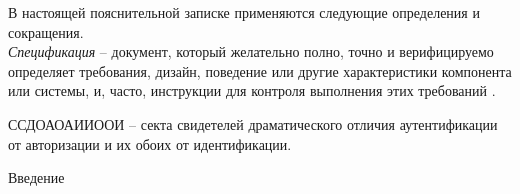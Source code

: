 \label{sec:definitions}

В настоящей пояснительной записке применяются следующие определения и сокращения.
\\

\emph{Спецификация} -- документ, который желательно полно, точно и верифицируемо определяет требования, дизайн, поведение или другие характеристики компонента или системы, и, часто, инструкции для контроля выполнения этих требований \cite{istqb_specification}.

ССДОАОАИИООИ -- секта свидетелей драматического отличия аутентификации от авторизации и их обоих от идентификации.


\label{sec:introduction}

Введение
